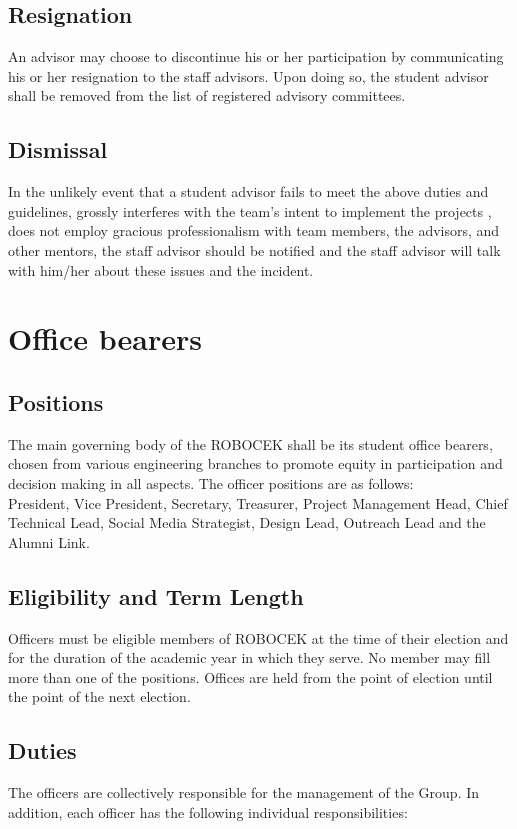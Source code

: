 \subsection{Resignation}
An advisor may choose to discontinue his or her participation by communicating his or her resignation to the staff advisors. Upon doing so, the student advisor shall be removed from the list of registered advisory committees.

\subsection{Dismissal}
In the unlikely event that a student advisor fails to meet the above duties and guidelines, grossly interferes with the team’s intent to implement the projects , does not employ gracious professionalism with team members, the advisors, and other mentors, the staff advisor should be notified and the staff advisor will talk with him/her about these issues and the incident. 

\section{Office bearers}

\subsection{Positions}
The main governing body of the ROBOCEK shall be its student office bearers, chosen from various engineering branches to promote equity in participation and decision making in all aspects. The officer positions are as follows:\\

President, Vice President, Secretary, Treasurer, Project Management Head, Chief Technical Lead, Social Media Strategist, Design Lead, Outreach Lead and the Alumni Link.

\subsection{Eligibility and Term Length}
Officers must be eligible members of ROBOCEK at the time of their election and for the duration of the academic year in which they serve. No member may fill more than one of the positions. Offices are held from the point of election until the point of the next election.

\subsection{Duties}
The officers are collectively responsible for the management of the Group. In addition, each officer has the following individual responsibilities: 

